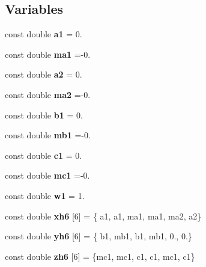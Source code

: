 \subsection*{Variables}
\begin{DoxyCompactItemize}
\item 
const double {\bfseries a1} = 0.\label{GaussQuadratureHex_8cc_ae00751647bfa59b71ac1818706053d30}

\item 
const double {\bfseries ma1} =-\/0.\label{GaussQuadratureHex_8cc_a3170014198b706d3c881b31b78ea063b}

\item 
const double {\bfseries a2} = 0.\label{GaussQuadratureHex_8cc_a98d3a479fc05565d44275a28469584d5}

\item 
const double {\bfseries ma2} =-\/0.\label{GaussQuadratureHex_8cc_aca0e077bf37df5f9fa3e94d001df66ab}

\item 
const double {\bfseries b1} = 0.\label{GaussQuadratureHex_8cc_a0d4d1bb8bfd85357ae3abaa60d89cae8}

\item 
const double {\bfseries mb1} =-\/0.\label{GaussQuadratureHex_8cc_a9494644d07b3bf9eab8ef162505c77b0}

\item 
const double {\bfseries c1} = 0.\label{GaussQuadratureHex_8cc_a3800b4c89b0f78f7e8c9b96534f98b52}

\item 
const double {\bfseries mc1} =-\/0.\label{GaussQuadratureHex_8cc_aeb4d008533de3c646ef8ac33c97fb01b}

\item 
const double {\bfseries w1} = 1.\label{GaussQuadratureHex_8cc_ad79f685408a628c34e6c0389d013e8c9}

\item 
const double {\bfseries xh6} [6] = \{ a1, a1, ma1, ma1, ma2, a2\}\label{GaussQuadratureHex_8cc_a5176e1fa3ff36c778872d5d50dd2d175}

\item 
const double {\bfseries yh6} [6] = \{ b1, mb1, b1, mb1, 0., 0.\}\label{GaussQuadratureHex_8cc_afc4624270f5f21558caedc4e6c6058e0}

\item 
const double {\bfseries zh6} [6] = \{mc1, mc1, c1, c1, mc1, c1\}\label{GaussQuadratureHex_8cc_a85462091e3ddd12d18c2d6a9a2962d07}


\end{DoxyCompactItemize}

